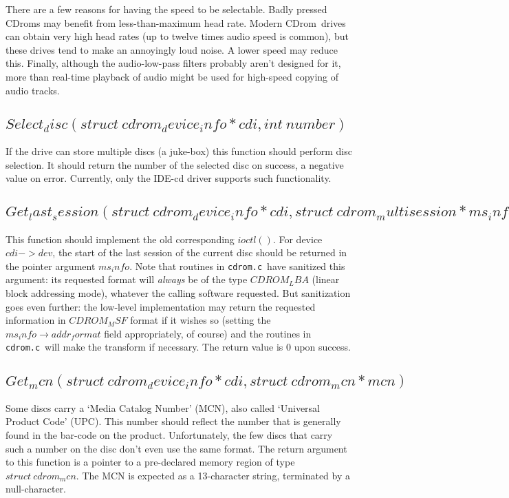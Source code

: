 \documentclass{article}
\def\cdrom{{\sc CDrom}}
\def\cdromc{{\tt cdrom.c}}
\begin{document}
There are a few reasons for having the speed to be selectable. Badly
pressed \cdrom s may benefit from less-than-maximum head rate. Modern
\cdrom\ drives can obtain very high head rates (up to twelve times
audio speed is common), but these drives tend to make an annoyingly
loud noise. A lower speed may reduce this. Finally, although the
audio-low-pass filters probably aren't designed for it, more than
real-time playback of audio might be used for high-speed copying of
audio tracks.

\subsection{$Select_disc(struct\ cdrom_device_info * cdi, int\ number)$}

If the drive can store multiple discs (a juke-box) this function
should perform disc selection. It should return the number of the
selected disc on success, a negative value on error. Currently, only
the IDE-cd driver supports such functionality.

\subsection{$Get_last_session(struct\ cdrom_device_info * cdi, struct\
  cdrom_multisession * ms_info)$}

This function should implement the old corresponding $ioctl()$. For
device $cdi->dev$, the start of the last session of the current disc
should be returned in the pointer argument $ms_info$. Note that
routines in \cdromc\ have sanitized this argument: its requested
format will {\em always\/} be of the type $CDROM_LBA$ (linear block
addressing mode), whatever the calling software requested. But
sanitization goes even further: the low-level implementation may
return the requested information in $CDROM_MSF$ format if it wishes so
(setting the $ms_info\rightarrow addr_format$ field appropriately, of
course) and the routines in \cdromc\ will make the transform if
necessary. The return value is 0 upon success.

\subsection{$Get_mcn(struct\ cdrom_device_info * cdi, struct\
  cdrom_mcn * mcn)$}

Some discs carry a `Media Catalog Number' (MCN), also called
`Universal Product Code' (UPC). This number should reflect the number
that is generally found in the bar-code on the product. Unfortunately,
the few discs that carry such a number on the disc don't even use the
same format. The return argument to this function is a pointer to a
pre-declared memory region of type $struct\ cdrom_mcn$. The MCN is
expected as a 13-character string, terminated by a null-character.
\end{document}
